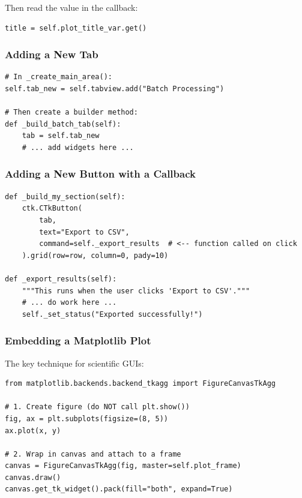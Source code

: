 \documentclass[11pt, letterpaper]{article}
\begin{document}
Then read the value in the callback:
\begin{lstlisting}[numbers=none]
title = self.plot_title_var.get()
\end{lstlisting}

\subsubsection*{Adding a New Tab}

\begin{lstlisting}[caption={Adding a new tab.}]
# In _create_main_area():
self.tab_new = self.tabview.add("Batch Processing")

# Then create a builder method:
def _build_batch_tab(self):
    tab = self.tab_new
    # ... add widgets here ...
\end{lstlisting}

\subsubsection*{Adding a New Button with a Callback}

\begin{lstlisting}[caption={Button with callback pattern.}]
def _build_my_section(self):
    ctk.CTkButton(
        tab,
        text="Export to CSV",
        command=self._export_results  # <-- function called on click
    ).grid(row=row, column=0, pady=10)

def _export_results(self):
    """This runs when the user clicks 'Export to CSV'."""
    # ... do work here ...
    self._set_status("Exported successfully!")
\end{lstlisting}

\subsubsection*{Embedding a Matplotlib Plot}

The key technique for scientific GUIs:

\begin{lstlisting}[caption={Embedding matplotlib inside tkinter.}]
from matplotlib.backends.backend_tkagg import FigureCanvasTkAgg

# 1. Create figure (do NOT call plt.show())
fig, ax = plt.subplots(figsize=(8, 5))
ax.plot(x, y)

# 2. Wrap in canvas and attach to a frame
canvas = FigureCanvasTkAgg(fig, master=self.plot_frame)
canvas.draw()
canvas.get_tk_widget().pack(fill="both", expand=True)
\end{lstlisting}
\end{document}
